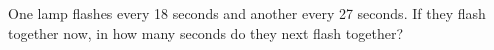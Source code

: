 One lamp flashes every 18 seconds and another every 27 seconds. If they flash together now, in how many seconds do they next flash together?
